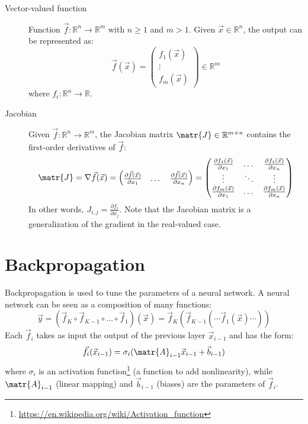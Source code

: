 \begin{description}
    \item[Vector-valued function]
        Function $\vec{f}: \mathbb{R}^n \rightarrow \mathbb{R}^m$ with $n \geq 1$ and $m > 1$.
        Given $\vec{x} \in \mathbb{R}^n$, the output can be represented as:
        \[
            \vec{f}(\vec{x}) = 
            \begin{pmatrix}
                f_1(\vec{x}) \\ \vdots \\ f_m(\vec{x})
            \end{pmatrix} \in \mathbb{R}^m
        \]
        where $f_i: \mathbb{R}^n \rightarrow \mathbb{R}$.

    \item[Jacobian] 
        Given $\vec{f}: \mathbb{R}^n \rightarrow \mathbb{R}^m$, the Jacobian matrix $\matr{J} \in \mathbb{R}^{m \times n}$
        contains the first-order derivatives of $\vec{f}$:
        \[
            \matr{J} = \nabla\vec{f}(\vec{x}) = 
            \begin{pmatrix}
                \frac{\partial \vec{f}(\vec{x})}{\partial x_1} & \dots & \frac{\partial \vec{f}(\vec{x})}{\partial x_n}
            \end{pmatrix} = 
            \begin{pmatrix}
                \frac{\partial f_1(\vec{x})}{\partial x_1} & \dots & \frac{\partial f_1(\vec{x})}{\partial x_n} \\
                \vdots & \ddots & \vdots \\
                \frac{\partial f_m(\vec{x})}{\partial x_1} & \dots & \frac{\partial f_m(\vec{x})}{\partial x_n} \\
            \end{pmatrix}
        \]
        In other words, $J_{i,j} = \frac{\partial f_i}{\partial x_j}$.
        Note that the Jacobian matrix is a generalization of the gradient in the real-valued case.
    \end{description}



\section{Backpropagation}
Backpropagation is used to tune the parameters of a neural network.
A neural network can be seen as a composition of many functions:
\[ \vec{y} = (\vec{f}_K \circ \vec{f}_{K-1} \circ \dots \circ \vec{f}_1)(\vec{x}) = \vec{f}_K(\vec{f}_{K-1}(\cdots \vec{f}_1(\vec{x}) \cdots)) \]
Each $\vec{f}_i$ takes as input the output of the previous layer $\vec{x}_{i-1}$ and has the form:
\[ \vec{f}_i(\vec{x}_{i-1}) = \sigma_i(\matr{A}_{i-1}\vec{x}_{i-1} + \vec{b}_{i-1}) \]
where $\sigma_i$ is an activation function\footnote{\url{https://en.wikipedia.org/wiki/Activation_function}} (a function to add nonlinearity), 
while $\matr{A}_{i-1}$ (linear mapping) and $\vec{b}_{i-1}$ (biases) are the parameters of $\vec{f}_i$.

